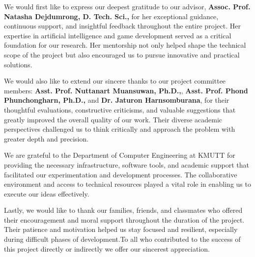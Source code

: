 \documentclass[12pt,oneside,openright,a4paper]{cpe-english-project}
\begin{document}
\quad We would first like to express our deepest gratitude to our advisor, \textbf {Assoc. Prof. Natasha Dejdumrong, D. Tech. Sci.,} for her exceptional guidance, continuous support, and insightful feedback throughout the entire project. Her expertise in artificial intelligence and game development served as a critical foundation for our research. Her mentorship not only helped shape the technical scope of the project but also encouraged us to pursue innovative and practical solutions.\par

\quad We would also like to extend our sincere thanks to our project committee members: \textbf {Asst. Prof. Nuttanart Muansuwan, Ph.D.,}, \textbf {Asst. Prof. Phond Phunchongharn, Ph.D.,} and \textbf {Dr. Jaturon Harnsomburana}, for their thoughtful evaluations, constructive criticisms, and valuable suggestions that greatly improved the overall quality of our work. Their diverse academic perspectives challenged us to think critically and approach the problem with greater depth and precision.\par

\quad We are grateful to the Department of Computer Engineering at KMUTT for providing the necessary infrastructure, software tools, and academic support that facilitated our experimentation and development processes. The collaborative environment and access to technical resources played a vital role in enabling us to execute our ideas effectively.\par

\quad Lastly, we would like to thank our families, friends, and classmates who offered their encouragement and moral support throughout the duration of the project. Their patience and motivation helped us stay focused and resilient, especially during difficult phases of development.To all who contributed to the success of this project directly or indirectly we offer our sincerest appreciation.\par

\tableofcontents                    
\listoftables
\listoffigures                      
\end{document}
